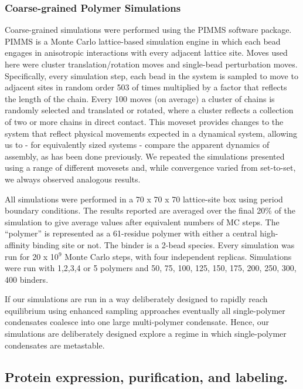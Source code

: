 \documentclass[../main.tex]{subfiles}
\begin{document}
    \subsubsection{Coarse-grained Polymer Simulations}
        Coarse-grained simulations were performed using the PIMMS software package\cite{Holehouse2019-cj,Martin2020-yc}. PIMMS is a Monte Carlo lattice-based simulation engine in which each bead engages in anisotropic interactions with every adjacent lattice site. Moves used here were cluster translation/rotation moves and single-bead perturbation moves. Specifically, every simulation step, each bead in the system is sampled to move to adjacent sites in random order 503 of times multiplied by a factor that reflects the length of the chain. Every 100 moves (on average) a cluster of chains is randomly selected and translated or rotated, where a cluster reflects a collection of two or more chains in direct contact. This moveset provides changes to the system that reflect physical movements expected in a dynamical system, allowing us to - for equivalently sized systems - compare the apparent dynamics of assembly, as has been done previously\cite{Bieler2012-nm,Boeynaems2019-ja,Fichthorn1991-wl,Saric2016-le}. We repeated the simulations presented using a range of different movesets and, while convergence varied from set-to-set, we always observed analogous results.

        All simulations were performed in a 70 x 70 x 70 lattice-site box using period boundary conditions. The results reported are averaged over the final 20\% of the simulation to give average values after equivalent numbers of MC steps. The “polymer” is represented as a 61-residue polymer with either a central high-affinity binding site or not. The binder is a 2-bead species. Every simulation was run for 20 x 10$^9$ Monte Carlo steps, with four independent replicas. Simulations were run with 1,2,3,4 or 5 polymers and 50, 75, 100, 125, 150, 175, 200, 250, 300, 400 binders. 

        If our simulations are run in a way deliberately designed to rapidly reach equilibrium using enhanced sampling approaches eventually all single-polymer condensates coalesce into one large multi-polymer condensate. Hence, our simulations are deliberately designed explore a regime in which single-polymer condensates are metastable.

    \subsection{Protein expression, purification, and labeling.}
\end{document}
